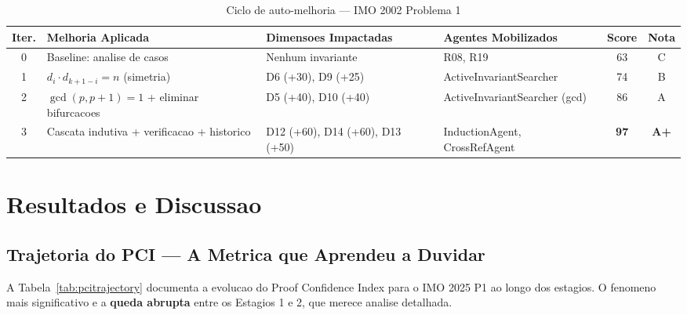 \documentclass[5p]{elsarticle}
\begin{document}
\begin{landscape}
\begin{table}[H]
  \centering
  \caption{Ciclo de auto-melhoria — IMO 2002 Problema 1}
  \label{tab:improve}
  \small
  \begin{tabular}{cp{3.5cm}p{4.5cm}p{4.5cm}cc}
    \toprule
    \textbf{Iter.} & \textbf{Melhoria Aplicada} & \textbf{Dimensoes Impactadas} & \textbf{Agentes Mobilizados} & \textbf{Score} & \textbf{Nota} \\
    \midrule
    0 & Baseline: analise de casos & Nenhum invariante & R08, R19 & 63 & C \\
    \rowcolor{yellowbg}
    1 & $d_i\cdot d_{k+1-i}=n$ (simetria) & D6 (+30), D9 (+25) & ActiveInvariantSearcher & 74 & B \\
    2 & $\gcd(p,p+1)=1$ + eliminar bifurcacoes & D5 (+40), D10 (+40) & ActiveInvariantSearcher (gcd) & 86 & A \\
    \rowcolor{greenbg}
    3 & Cascata indutiva + verificacao + historico & D12 (+60), D14 (+60), D13 (+50) & InductionAgent, CrossRefAgent & \textbf{97} & \textbf{A+} \\
    \bottomrule
  \end{tabular}
\end{table}
\end{landscape}

\section{Resultados e Discussao}

\subsection{Trajetoria do PCI — A Metrica que Aprendeu a Duvidar}

A Tabela~\ref{tab:pcitrajectory} documenta a evolucao do Proof Confidence
Index para o IMO 2025 P1 ao longo dos estagios. O fenomeno mais significativo
e a \textbf{queda abrupta} entre os Estagios 1 e 2, que merece analise
detalhada.
\end{document}
